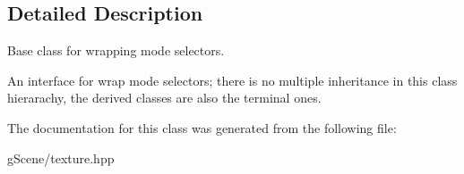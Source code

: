 \subsection{Detailed Description}
Base class for wrapping mode selectors. 

An interface for wrap mode selectors; there is no multiple inheritance in this class hierarachy, the derived classes are also the terminal ones. 

The documentation for this class was generated from the following file\-:\begin{DoxyCompactItemize}
\item 
g\-Scene/texture.\-hpp\end{DoxyCompactItemize}
